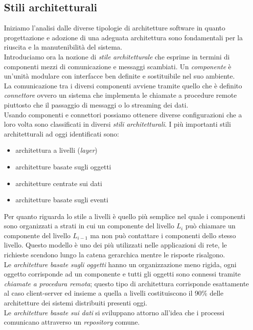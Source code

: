 \subsection{Stili architetturali}
Iniziamo l'analisi dalle diverse tipologie di architetture software in quanto progettazione e adozione di una adeguata architettura sono fondamentali per la riuscita e la manutenibilità del sistema.\\
Introduciamo ora la nozione di \emph{stile architetturale} che esprime in termini di componenti mezzi di comunicazione e messaggi scambiati. Un \emph{componente} è un'unità modulare con interfacce ben definite e sostituibile nel suo ambiente.\\
La comunicazione tra i diversi componenti avviene tramite quello che è definito \emph{connettore} ovvero un sistema che implementa le chiamate a procedure remote piuttosto che il passaggio di messaggi o lo streaming dei dati.\\
Usando componenti e connettori possiamo ottenere diverse configurazioni che a loro volta sono classificati in diversi \emph{stili architetturali}. I più importanti stili architetturali ad oggi identificati sono:
\begin{itemize}
\item architettura a livelli (\emph{layer})
\item architetture basate sugli oggetti
\item architetture centrate sui dati
\item architetture basate sugli eventi
\end{itemize}
Per quanto riguarda lo stile a livelli è quello più semplice nel quale i componenti sono organizzati a strati in cui un componente del livello $L_i$ può chiamare un componente del livello $L_{i-1}$ ma non può contattare i componenti dello stesso livello. Questo modello è uno dei più utilizzati nelle applicazioni di rete, le richieste scendono lungo la catena gerarchica mentre le risposte risalgono.\\
Le \emph{architetture basate sugli oggetti} hanno un organizzazione meno rigida, ogni oggetto corrisponde ad un componente e tutti gli oggetti sono connessi tramite \emph{chiamate a procedura remota}; questo tipo di architettura corrisponde esattamente al caso client-server ed insieme a quella a livelli costituiscono il 90\% delle architetture dei sistemi distribuiti presenti oggi.\\
Le \emph{architetture basate sui dati} si sviluppano attorno all'idea che i processi comunicano attraverso un \emph{repository} comune.\\
